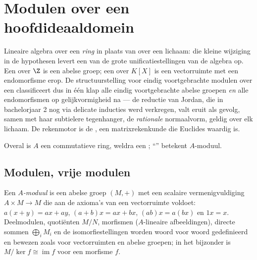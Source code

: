 \chapter{Modulen over een hoofdideaaldomein}\label{ch:b3:modules}

Lineaire algebra over een \emph{ring} in plaats van over een
lichaam: die kleine wijziging in de hypothesen levert een van de
grote unificatiestellingen van de algebra op. Een  over $\Z$
is een abelse groep; een  over $K[X]$ is een vectorruimte
met een endomorfisme erop. De structuurstelling voor eindig
voortgebrachte modulen over een  classificeert
dus in één klap alle eindig voortgebrachte abelse groepen \emph{en}
alle endomorfismen op gelijkvormigheid na --- de reductie van
Jordan, die in bachelorjaar 2 nog via delicate inducties werd
verkregen, valt eruit als gevolg, samen met haar subtielere
tegenhanger, de \emph{rationale} normaalvorm, geldig over elk
lichaam. De rekenmotor is de , een
matrixrekenkunde die Euclides waardig is.

Overal is $A$ een commutatieve ring, weldra een ;
``'' betekent $A$-moduul.

\section{Modulen, vrije modulen}

\begin{definition}\label{def:b3:modules:module}
Een \emph{$A$-moduul} is een abelse groep $(M, +)$
met een scalaire vermenigvuldiging $A \times M \to M$ die aan de
axioma's van een vectorruimte voldoet: $a(x + y) = ax + ay$, $(a +
b)x = ax + bx$, $(ab)x = a(bx)$ en $1x = x$. Deelmodulen,
quotiënten $M/N$, morfismen ($A$-lineaire afbeeldingen), directe
sommen $\bigoplus_i M_i$ en de isomorfiestellingen worden woord
voor woord gedefinieerd en bewezen zoals voor vectorruimten en
abelse groepen; in het bijzonder is $M/\ker f \cong
\operatorname{im} f$ voor een morfisme $f$.
\end{definition}

